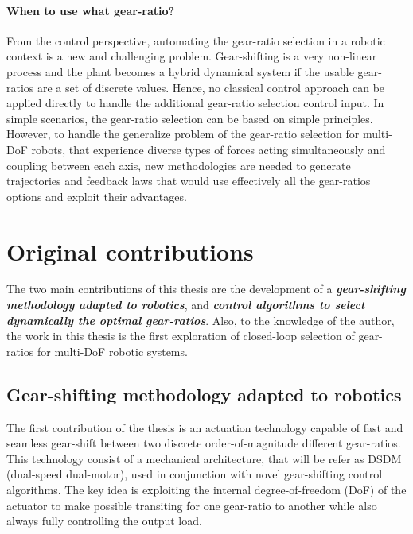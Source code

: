 \paragraph{When to use what gear-ratio?}
From the control perspective, automating the gear-ratio selection in a robotic context is a new and challenging problem. Gear-shifting is a very non-linear process and the plant becomes a hybrid dynamical system if the usable gear-ratios are a set of discrete values. Hence, no classical control approach can be applied directly to handle the additional gear-ratio selection control input. In simple scenarios, the gear-ratio selection can be based on simple principles. However, to handle the generalize problem of the gear-ratio selection for multi-DoF robots, that experience diverse types of forces acting simultaneously and coupling between each axis, new methodologies are needed to generate trajectories and feedback laws that would use effectively all the gear-ratios options and exploit their advantages.



\section{Original contributions}
\label{sec:contribution}

The two main contributions of this thesis are the development of a \emph{\textbf{gear-shifting methodology adapted to robotics}}, and \emph{\textbf{control algorithms to select dynamically the optimal gear-ratios}}. Also, to the knowledge of the author, the work in this thesis is the first exploration of closed-loop selection of gear-ratios for multi-DoF robotic systems. 


\subsection{Gear-shifting methodology adapted to robotics}

The first contribution of the thesis is an actuation technology capable of fast and seamless gear-shift between two discrete order-of-magnitude different gear-ratios. This technology consist of a mechanical architecture, that will be refer as DSDM (dual-speed dual-motor), used in conjunction with novel gear-shifting control algorithms. The key idea is exploiting the internal degree-of-freedom (DoF) of the actuator to make possible transiting for one gear-ratio to another while also always fully controlling the output load. 

